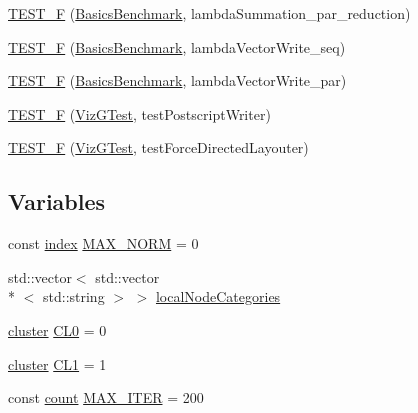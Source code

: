 \begin{DoxyCompactItemize}
\hyperlink{namespace_networ_kit_a51ed91c38314e4be58d3529bcd16a997}{T\-E\-S\-T\-\_\-\-F} (\hyperlink{class_networ_kit_1_1_basics_benchmark}{Basics\-Benchmark}, lambda\-Summation\-\_\-par\-\_\-reduction)
\item 
\hyperlink{namespace_networ_kit_a66a4d947cf9afac020e849d49e34e341}{T\-E\-S\-T\-\_\-\-F} (\hyperlink{class_networ_kit_1_1_basics_benchmark}{Basics\-Benchmark}, lambda\-Vector\-Write\-\_\-seq)
\item 
\hyperlink{namespace_networ_kit_a84c2c9ba58ae9af58ad54baa96d43cdf}{T\-E\-S\-T\-\_\-\-F} (\hyperlink{class_networ_kit_1_1_basics_benchmark}{Basics\-Benchmark}, lambda\-Vector\-Write\-\_\-par)
\item 
\hyperlink{namespace_networ_kit_a31569f385bfd0b7fd1ab5ff0af9f6298}{T\-E\-S\-T\-\_\-\-F} (\hyperlink{class_networ_kit_1_1_viz_g_test}{Viz\-G\-Test}, test\-Postscript\-Writer)
\item 
\hyperlink{namespace_networ_kit_ac7b6019b812e2f12ac35d9b257ee5618}{T\-E\-S\-T\-\_\-\-F} (\hyperlink{class_networ_kit_1_1_viz_g_test}{Viz\-G\-Test}, test\-Force\-Directed\-Layouter)
\end{DoxyCompactItemize}
\subsection*{Variables}
\begin{DoxyCompactItemize}
\item 
const \hyperlink{namespace_networ_kit_a486772e5516be73694ef0d780b828d04}{index} \hyperlink{namespace_networ_kit_a9b1d7bac39eea8fc38c8b081d78723d7}{M\-A\-X\-\_\-\-N\-O\-R\-M} = 0
\item 
std\-::vector$<$ std\-::vector\\*
$<$ std\-::string $>$ $>$ \hyperlink{namespace_networ_kit_abe047b75f75755f8731975966e4d1fa5}{local\-Node\-Categories}
\item 
\hyperlink{namespace_networ_kit_a189884f50c41226806b31842d2214b71}{cluster} \hyperlink{namespace_networ_kit_ac775c85228933ad06cfd57f3ae397ec4}{C\-L0} = 0
\item 
\hyperlink{namespace_networ_kit_a189884f50c41226806b31842d2214b71}{cluster} \hyperlink{namespace_networ_kit_ac7af040d704205102a91474b7ed6f923}{C\-L1} = 1
\item 
const \hyperlink{namespace_networ_kit_a76b399edfa50ae72e4aa86007aaa800a}{count} \hyperlink{namespace_networ_kit_a8fbda1865e8f5153404bad7c20dc166e}{M\-A\-X\-\_\-\-I\-T\-E\-R} = 200
\end{DoxyCompactItemize}



